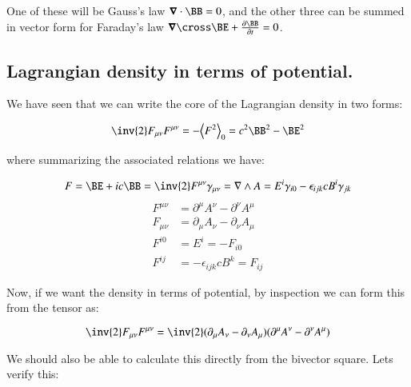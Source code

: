 One of these will be Gauss's law $\spacegrad \cdot \BB = 0$, and the other three can be summed in vector form for Faraday's law $\spacegrad \cross \BE + \PD{t}{\BB} = 0$.

\subsection{Lagrangian density in terms of potential. }

We have seen that we can write the core of the Lagrangian density in two forms:

\begin{equation*}
\inv{2} F_{\mu\nu}F^{\mu\nu} = -\gpgradezero{F^2} = c^2 \BB^2 -\BE^2
\end{equation*}

where summarizing the associated relations we have:

\begin{equation*}
F = \BE + i c \BB = \inv{2} F^{\mu\nu} \gamma_{\mu\nu} = \grad \wedge A = E^i \gamma_{i 0} - \epsilon_{i j k} c B^i \gamma_{j k}
\end{equation*}
\begin{align*}
F^{\mu\nu} &= \partial^{\mu} A^{\nu} - \partial^{\nu} A^{\mu} \\
F_{\mu\nu} &= \partial_{\mu} A_{\nu} - \partial_{\nu} A_{\mu} \\
F^{i0} &= E^i = -F_{i0} \\
F^{ij} &= -\epsilon_{i j k} c B^k = F_{ij}
\end{align*}

Now, if we want the density in terms of potential, by inspection we can form this from the tensor as:

\begin{equation*}
\inv{2} F_{\mu\nu}F^{\mu\nu} = \inv{2} (\partial_{\mu} A_{\nu} - \partial_{\nu} A_{\mu} ) (\partial^{\mu} A^{\nu} - \partial^{\nu} A^{\mu} )
\end{equation*}

We should also be able to calculate this directly from the bivector square.  Lets verify this:

